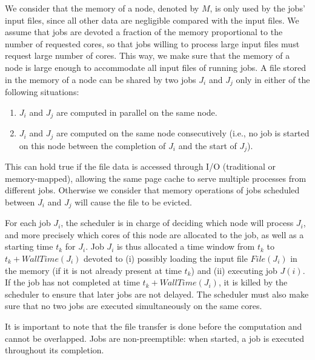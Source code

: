 \documentclass[sigconf,review,anonymous]{acmart}
\newcommand{\Node}[1]{\ensuremath{\mathrm{Node}_{#1}}\xspace}
\newcommand{\file}{\ensuremath{\mathit{File}}\xspace}
\newcommand{\storage}{\ensuremath{\mathit{Storage}}\xspace}
\newcommand{\size}{\ensuremath{\mathit{Size}}\xspace}
\newcommand{\memory}{\ensuremath{\mathit{M}}\xspace}
\newcommand{\walltime}{\mathit{WallTime}\xspace}
\begin{document}
We consider that the memory of a node, denoted by
$\memory$, is only used by the jobs' input files, since all other data are
negligible compared with the input files. We assume that jobs are
devoted a fraction of the memory proportional to the number of
requested cores, so that jobs willing to process large input files
must request large number of cores. This way, we make sure that the
memory of a node is large enough to accommodate all input files of running jobs.
A file stored in the memory of a node can be shared by two jobs $J_i$
and $J_j$ only in either of the following situations:
\begin{enumerate}
	\item $J_i$ and $J_j$ are computed in parallel on the same node.
	\item $J_i$ and $J_j$ are computed on the same node
          consecutively (i.e., no job is started on this node between the
          completion of $J_i$ and the start of $J_j$).
\end{enumerate}
This can hold true if the file data is accessed through I/O (traditional or memory-mapped),
allowing the same page cache to serve multiple processes from different jobs.
Otherwise we consider that memory operations of jobs scheduled between
$J_i$ and $J_j$ will cause the file to be evicted.


For each job $J_i$, the scheduler is in charge of deciding which node
will process $J_i$, and more precisely which cores of this node
are allocated to the job, as well as a starting time $t_k$ for $J_i$. Job
$J_i$ is thus allocated a time window from $t_k$ to
$t_k+\walltime(J_i)$ devoted to (i) possibly loading the input file
$\file(J_i)$ in the memory (if it is not already present at time
$t_k$) and (ii) executing job $J(i)$. If the job has not completed at
time $t_k+\walltime(J_i)$, it is killed by the scheduler to ensure
that later jobs are not delayed.  The scheduler must also make sure
that no two jobs are executed simultaneously on the same cores.

It is important to note that the file transfer is done before the computation and cannot be overlapped.
Jobs are non-preemptible: when started, a job is executed throughout its completion.
\end{document}
